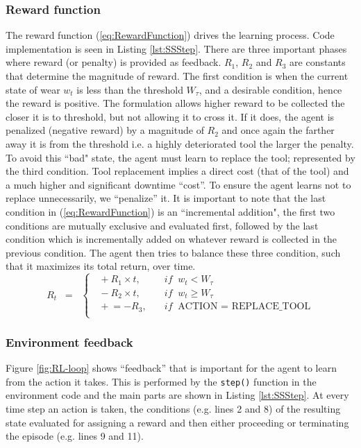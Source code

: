 \documentclass[a4paper, 12pt]{article}
\begin{document}
\subsubsection*{Reward function}
The reward function (\ref{eq:RewardFunction}) drives the learning process. Code implementation is seen in Listing \ref{lst:SSStep}. There are three important phases where reward (or penalty) is provided as feedback. $R_1$, $R_2$ and $R_3$ are constants that determine the magnitude of reward. The first condition is when the current state of wear $w_t$ is less than the threshold $W_\tau$, and a desirable condition, hence the reward is positive. The formulation allows higher reward to be collected the closer it is to threshold, but not allowing it to cross it. If it does, the agent is penalized (negative reward) by a magnitude of $R_2$ and once again the farther away it is from the threshold i.e. a highly deteriorated tool the larger the penalty. To avoid this ``bad" state, the agent must learn to replace the tool; represented by the third condition. Tool replacement implies a direct cost (that of the tool) and a much higher and significant downtime ``cost''. To ensure the agent learns not to replace unnecessarily, we ``penalize'' it. It is important to note that the last condition in (\ref{eq:RewardFunction}) is an ``incremental addition", the first two conditions are mutually exclusive and evaluated first, followed by the last condition which is incrementally added on whatever reward is collected in the previous condition. The agent then tries to balance these three condition, such that it maximizes its total return, over time.
\begin{equation}
	R_t \;\;=\;\;
	\begin{cases}
		\;\;  +R_1 \times t, & \quad if \;\; w_t < W_\tau\\
		\;\;  -R_2 \times t, & \quad if \;\; w_t\ge W_\tau\\
		\;\; \mathrel{+}= -R_3, & \quad if \;\; \text{ACTION = REPLACE\_TOOL}\\
	\end{cases}
	\label{eq:RewardFunction}
\end{equation}

\subsubsection*{Environment feedback}
Figure \ref{fig:RL-loop} shows ``feedback'' that is important for the agent to learn from the action it takes. This is performed by the \texttt{step()} function in the environment code and the main parts are shown in Listing \ref{lst:SSStep}. At every time step an action is taken, the conditions (e.g. lines 2 and 8) of the resulting state evaluated for assigning a reward and then either proceeding or terminating the episode (e.g. lines 9 and 11).
\end{document}
